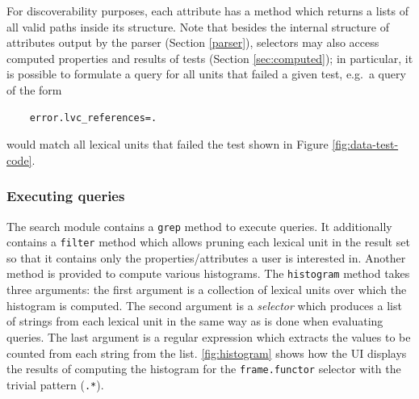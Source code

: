 \documentclass[10pt, a4paper]{article}
\newcommand{\py}[1]{{\tt #1}}
\begin{document}
For discoverability purposes, each attribute has a method which returns a lists of all valid paths
inside its structure.
Note that besides the internal structure of attributes output by the parser (Section \ref{parser}),
selectors may also access computed properties and results of tests (Section \ref{sec:computed});
in particular, it is possible to formulate a query for all units that failed a given test,
e.g.\ a query of the form
\begin{verbatim}
    error.lvc_references=.
\end{verbatim}
would match all lexical units that failed the test shown in Figure \ref{fig:data-test-code}.


\subsubsection{Executing queries}\label{sec:execute_query}
The search module contains a \py{grep} method to execute queries. It additionally contains a \py{filter}
method which allows pruning each lexical unit in the result set so that it contains only the properties/attributes a user is interested in. Another method is provided to compute various histograms.
The \py{histogram} method takes three arguments: the first argument is a collection of lexical units over which the histogram is computed. The second argument is a \emph{selector} which produces a list of strings
from each lexical unit in the same way as is done when evaluating queries. The last argument is a
regular expression which extracts the values to be counted from each string from the list. \autoref{fig:histogram}
shows how the UI displays the results of computing the histogram for the {\tt frame.functor} selector with
the trivial pattern ({\tt .*}).
\end{document}
